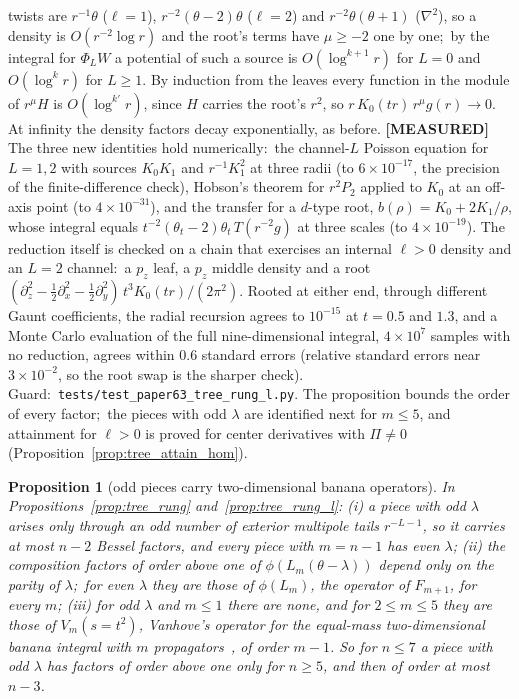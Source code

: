 \documentclass[aps,pra,twocolumn,superscriptaddress,longbibliography]{revtex4-2}
\newtheorem{proposition}{Proposition}
\begin{document}
twists are $r^{-1}\theta$ ($\ell=1$), $r^{-2}(\theta-2)\theta$ ($\ell=2$) and
$r^{-2}\theta(\theta+1)$ ($\nabla^2$), so a density is $O(r^{-2}\log r)$ and
the root's terms have $\mu\ge-2$ one by one;\ by the integral for $\Phi_LW$ a
potential of such a source is $O(\log^{k+1}r)$ for $L=0$ and $O(\log^kr)$ for
$L\ge1$.  By induction from the leaves every function in the module of
$r^{\mu}H$ is $O(\log^{k'}r)$, since $H$ carries the root's $r^2$, so
$r\,K_0(tr)\,r^{\mu}g(r)\to0$.  At
infinity the density factors decay exponentially, as before.
\textbf{[MEASURED]} The three new identities hold numerically:\ the
channel-$L$ Poisson equation for $L=1,2$ with sources $K_0K_1$ and
$r^{-1}K_1^2$ at three radii (to $6\times10^{-17}$, the precision of the
finite-difference check), Hobson's theorem for $r^2P_2$ applied to $K_0$ at an
off-axis point (to $4\times10^{-31}$), and the transfer for a $d$-type root,
$b(\rho)=K_0+2K_1/\rho$, whose integral equals
$t^{-2}(\theta_t-2)\theta_t\,T(r^{-2}g)$ at three scales (to $4\times10^{-19}$).
The reduction itself is checked on a chain that exercises an internal $\ell>0$
density and an $L=2$ channel:\ a $p_z$ leaf, a $p_z$ middle density and a root
$(\partial_z^2-\tfrac12\partial_x^2-\tfrac12\partial_y^2)\,t^3K_0(tr)/(2\pi^2)$.
Rooted at either end, through different Gaunt coefficients, the radial
recursion agrees to $10^{-15}$ at $t=0.5$ and $1.3$, and a Monte Carlo
evaluation of the full nine-dimensional integral, $4\times10^7$ samples with
no reduction, agrees within $0.6$ standard errors (relative standard errors
near $3\times10^{-2}$, so the root swap is the sharper check).  Guard:\ \texttt{tests/test\_paper63\_tree\_rung\_l.py}.
The proposition bounds the order of every factor;\ the pieces with odd
$\lambda$ are identified next for $m\le5$, and attainment for $\ell>0$ is proved for
center derivatives with $\Pi\neq0$ (Proposition~\ref{prop:tree_attain_hom}).

\begin{proposition}[odd pieces carry two-dimensional banana operators]
\label{prop:odd_banana}
In Propositions~\ref{prop:tree_rung} and~\ref{prop:tree_rung_l}:
(i) a piece with odd $\lambda$ arises only through an odd number of exterior
multipole tails $r^{-L-1}$, so it carries at most $n-2$ Bessel factors, and every
piece with $m=n-1$ has even $\lambda$;
(ii) the composition factors of order above one of
$\phi(L_m(\theta-\lambda))$ depend only on the parity of $\lambda$;\ for even
$\lambda$ they are those of $\phi(L_m)$, the operator of $F_{m+1}$, for every
$m$;
(iii) for odd $\lambda$ and $m\le1$ there are none, and for $2\le m\le5$ they are those of $V_m(s=t^2)$,
Vanhove's operator for the equal-mass two-dimensional banana integral with $m$
propagators~\cite{vanhove2014}, of order $m-1$.
So for $n\le7$ a piece with odd $\lambda$ has factors of order above one only
for $n\ge5$, and then of order at most $n-3$.
\end{proposition}
\end{document}
